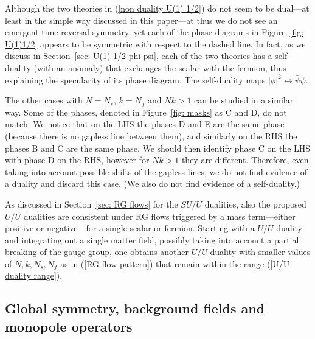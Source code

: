 \documentclass[a4paper, 12pt]{article}
\numberwithin{equation}{section}
\begin{document}
Although the two theories in (\ref{non duality U(1) 1/2}) do not seem to be dual---at least in the simple way discussed in this paper---at thus we do not see an emergent time-reversal symmetry, yet each of the phase diagrams in Figure~\ref{fig: U(1)1/2} appears to be symmetric with respect to the dashed line. In fact, as we discuss in Section~\ref{sec: U(1)-1/2 phi psi}, each of the two theories has a self-duality (with an anomaly) that exchanges the scalar with the fermion, thus explaining the specularity of its phase diagram. The self-duality maps $|\phi|^2 \leftrightarrow \bar\psi\psi$.

The other cases with $N=N_s$, $k=N_f$ and $Nk>1$ can be studied in a similar way. Some of the phases, denoted in Figure~\ref{fig: masks} as C and D, do not match. We notice that on the LHS the phases D and E are the same phase (because there is no gapless line between them), and similarly on the RHS the phases B and C are the same phase. We should then identify phase C on the LHS with phase D on the RHS, however for $Nk>1$ they are different. Therefore, even taking into account possible shifts of the gapless lines, we do not find evidence of a duality and discard this case. (We also do not find evidence of a self-duality.)

As discussed in Section~\ref{sec: RG flows} for the $SU/U$ dualities, also the proposed $U/U$ dualities are consistent under RG flows triggered by a mass term---either positive or negative---for a single scalar or fermion. Starting with a $U/U$ duality and integrating out a single matter field, possibly taking into account a partial breaking of the gauge group, one obtains another $U/U$ duality with smaller values of $N,k, N_s, N_f$ as in (\ref{RG flow pattern}) that remain within the range (\ref{U/U duality range}).








\subsection{Global symmetry, background fields and monopole operators}
\end{document}
